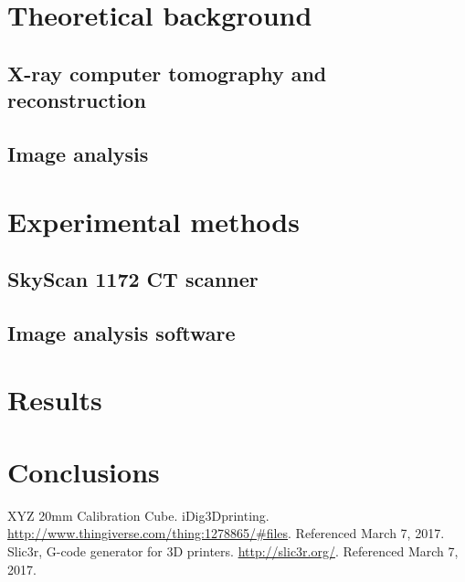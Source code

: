 \documentclass[a4paper,twoside,12pt]{article}
\begin{document}
\section{Theoretical background}
\subsection{X-ray computer tomography and reconstruction}

\subsection{Image analysis}

\section{Experimental methods}
\subsection{SkyScan 1172 CT scanner}

\subsection{Image analysis software}

\section{Results}

\section{Conclusions}

\clearpage

\begin{thebibliography}{9}
     XYZ 20mm Calibration Cube. iDig3Dprinting. \url{http://www.thingiverse.com/thing:1278865/#files}. Referenced March 7, 2017.
     Slic3r, G-code generator for 3D printers. \url{http://slic3r.org/}. Referenced March 7, 2017.
\end{thebibliography}
\end{document}
